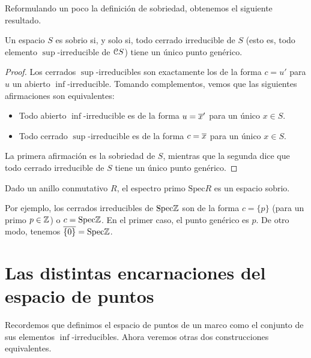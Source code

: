 Reformulando un poco la definición de sobriedad,
obtenemos el siguiente resultado.
\begin{lemma}
    Un espacio $S$ es sobrio si, y solo si,
    todo cerrado irreducible de $S$
    (esto es, todo elemento $\sup$-irreducible de $\cal CS$)
    tiene un único punto genérico.
\end{lemma}
\begin{proof}
    Los cerrados $\sup$-irreducibles son exactamente
    los de la forma $c=u'$ para $u$ un abierto $\inf$-irreducible.
    Tomando complementos, vemos que las siguientes afirmaciones
    son equivalentes:
    \begin{itemize}
         \item Todo abierto $\inf$-irreducible es de
         la forma $u=\ol{x}'$ para un único $x\in S$.
         \item Todo cerrado $\sup$-irreducible es de
         la forma $c=\ol x$ para un único $x\in S$.
    \end{itemize}
    La primera afirmación es la sobriedad de $S$,
    mientras que la segunda dice que todo cerrado
    irreducible de $S$ tiene un único punto genérico.
\end{proof}

\begin{example}
    Dado un anillo conmutativo $R$,
    el espectro primo $\mathrm{Spec}R$ es un espacio sobrio.
    
    Por ejemplo, los cerrados irreducibles de $\mathrm{Spec}\Z$ son
    de la forma $c=\{p\}$ (para un primo $p\in\Z$) o $c=\mathrm{Spec}\Z$.
    En el primer caso, el punto genérico es $p$.
    De otro modo, tenemos $\ol{\{0\}}=\mathrm{Spec}\Z$.
\end{example}




\section{Las distintas encarnaciones del espacio de puntos}

Recordemos que definimos el espacio de puntos de un marco
como el conjunto de sus elementos $\inf$-irreducibles.
Ahora veremos otras dos construcciones equivalentes.

